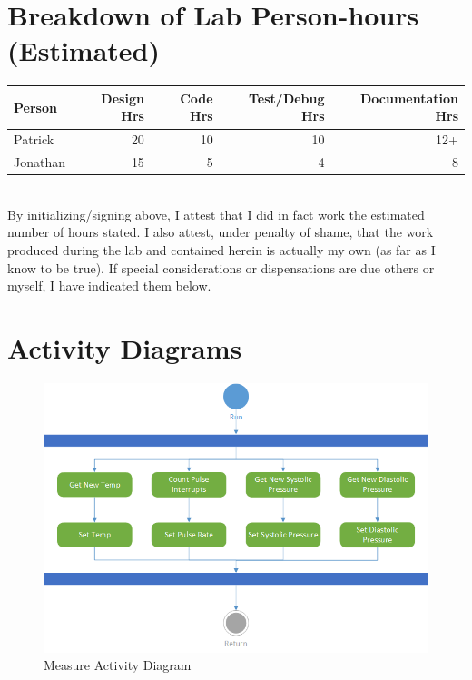 \documentclass[12pt]{article} %
\begin{document}
    \pagebreak
    \appendix

    \section{Breakdown of Lab Person-hours (Estimated)}

    \begin{tabular}{|l|*{4}{r|}}
      \hline
      Person & Design Hrs & Code Hrs & Test/Debug Hrs & Documentation Hrs \\ \hline
      Patrick & 20 & 10 & 10 & 12+  \\ \hline
      Jonathan & 15 & 5 & 4 & 8  \\ \hline
    \end{tabular}

    ~\\

    By initializing/signing above, I attest that I did in fact work the
    estimated number of hours stated. I also attest, under penalty of shame,
    that the work produced during the lab and contained herein is actually my
    own (as far as I know to be true). If special considerations or
    dispensations are due others or myself, I have indicated them below.

    \pagebreak

    \section{Activity Diagrams}

    \begin{figure}[H]
      \centering
      \includegraphics[width=\textwidth]{../design/measure_activity.png}
      \caption{Measure Activity Diagram}
      \label{fig:measureActivity}
    \end{figure}
\end{document}
